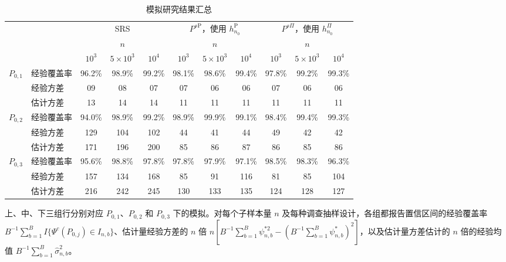 \begin{table}[htbp]
\centering
\caption{模拟研究结果汇总}
\label{tab:ch29-results}
\begingroup
\small
\setlength{\tabcolsep}{3pt}
\renewcommand{\arraystretch}{1.13}
\begin{tabular}{@{}ll*{9}{c}@{}}
\toprule
&&\multicolumn{3}{c}{SRS}&\multicolumn{3}{c}{$P^{s\mathrm P}$，使用 $h_{n_0}^{\mathrm P}$}&\multicolumn{3}{c}{$P^{s\Pi}$，使用 $h_{n_0}^{\Pi}$}\\
\cmidrule(lr){3-5}\cmidrule(lr){6-8}\cmidrule(lr){9-11}
&&\multicolumn{3}{c}{$n$}&\multicolumn{3}{c}{$n$}&\multicolumn{3}{c}{$n$}\\
&&$10^3$&$5\times10^3$&$10^4$&$10^3$&$5\times10^3$&$10^4$&$10^3$&$5\times10^3$&$10^4$\\
\midrule
$P_{0,1}$&经验覆盖率&96.2\%&98.9\%&99.2\%&98.1\%&98.6\%&99.4\%&97.8\%&99.2\%&99.3\%\\
&经验方差&09&08&07&07&06&06&07&06&06\\
&估计方差&13&14&14&11&11&11&11&11&11\\
\midrule
$P_{0,2}$&经验覆盖率&94.0\%&98.9\%&99.2\%&98.9\%&99.9\%&99.1\%&98.4\%&99.4\%&99.3\%\\
&经验方差&129&104&102&44&41&44&49&42&42\\
&估计方差&171&196&200&85&86&87&86&85&86\\
\midrule
$P_{0,3}$&经验覆盖率&95.6\%&98.8\%&97.8\%&97.8\%&97.9\%&97.1\%&98.5\%&98.3\%&96.3\%\\
&经验方差&157&134&168&85&91&116&81&85&104\\
&估计方差&216&242&245&130&133&135&124&128&127\\
\bottomrule
\end{tabular}
\endgroup
\par\medskip
\begin{minipage}{\linewidth}
\footnotesize
上、中、下三组行分别对应 $P_{0,1}$、$P_{0,2}$ 和 $P_{0,3}$ 下的模拟。对每个子样本量 $n$ 及每种调查抽样设计，各组都报告置信区间的经验覆盖率 $B^{-1}\sum_{b=1}^BI\{\Psi^c(P_{0,j})\in I_{n,b}\}$、估计量经验方差的 $n$ 倍 $n[B^{-1}\sum_{b=1}^B\psi_{n,b}^{*2}-(B^{-1}\sum_{b=1}^B\psi_{n,b}^*)^2]$，以及估计量方差估计的 $n$ 倍的经验均值 $B^{-1}\sum_{b=1}^B\hat\sigma_{n,b}^2$。
\end{minipage}
\end{table}
